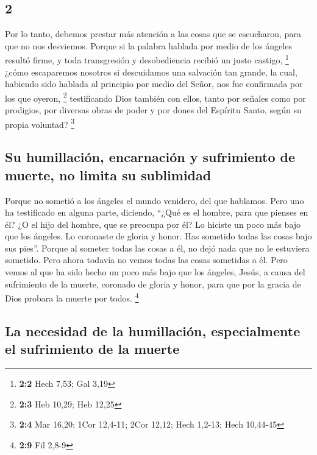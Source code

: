 \begin{paracol}{2}
\hypertarget{section-2}{%
\section{2}\label{section-2}}

 Por lo tanto, debemos prestar más atención a las cosas
que se escucharon, para que no nos desviemos.  Porque si
la palabra hablada por medio de los ángeles resultó firme, y toda
transgresión y desobediencia recibió un justo castigo, \footnote{\textbf{2:2}
  Hech 7,53; Gal 3,19}  ¿cómo escaparemos nosotros si
descuidamos una salvación tan grande, la cual, habiendo sido hablada al
principio por medio del Señor, nos fue confirmada por los que oyeron,
\footnote{\textbf{2:3} Heb 10,29; Heb 12,25}  testificando
Dios también con ellos, tanto por señales como por prodigios, por
diversas obras de poder y por dones del Espíritu Santo, según su propia
voluntad? \footnote{\textbf{2:4} Mar 16,20; 1Cor 12,4-11; 2Cor 12,12;
  Hech 1,2-13; Hech 10,44-45}

\hypertarget{su-humillaciuxf3n-encarnaciuxf3n-y-sufrimiento-de-muerte-no-limita-su-sublimidad}{%
\subsection{Su humillación, encarnación y sufrimiento de muerte, no
limita su
sublimidad}\label{su-humillaciuxf3n-encarnaciuxf3n-y-sufrimiento-de-muerte-no-limita-su-sublimidad}}

 Porque no sometió a los ángeles el mundo venidero, del
que hablamos.  Pero uno ha testificado en alguna parte,
diciendo, ``¿Qué es el hombre, para que pienses en él? ¿O el hijo del
hombre, que se preocupa por él?  Lo hiciste un poco más
bajo que los ángeles. Lo coronaste de gloria y honor.  Has
sometido todas las cosas bajo sus pies''. Porque al someter todas las
cosas a él, no dejó nada que no le estuviera sometido. Pero ahora
todavía no vemos todas las cosas sometidas a él.  Pero
vemos al que ha sido hecho un poco más bajo que los ángeles, Jesús, a
causa del sufrimiento de la muerte, coronado de gloria y honor, para que
por la gracia de Dios probara la muerte por todos. \footnote{\textbf{2:9}
  Fil 2,8-9}

\hypertarget{la-necesidad-de-la-humillaciuxf3n-especialmente-el-sufrimiento-de-la-muerte}{%
\subsection{La necesidad de la humillación, especialmente el sufrimiento
de la
muerte}\label{la-necesidad-de-la-humillaciuxf3n-especialmente-el-sufrimiento-de-la-muerte}}


\end{paracol}
